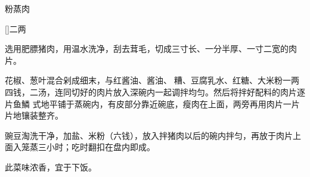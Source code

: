 %
%
%
%
%
%
%
\begin{recipe}{粉蒸肉}

\ingredients

[\footnotemark]{二两}

\preparation

\step 选用肥膘猪肉，用温水洗净，刮去茸毛，切成三寸长、一分半厚、一寸二宽的肉片。

\step 花椒、葱叶混合剁成细末，与红酱油、酱油、𰪿糟、豆腐乳水、红糖、大米粉一两
四钱，二汤，连同切好的肉片放入深碗内一起调拌均匀。然后将拌好配料的肉片逐片鱼鱗
式地平铺于蒸碗内，有皮部分靠近碗底，瘦肉在上面，两旁再用肉片一片片地镶装整齐。

\step 豌豆淘洗干净，加盐、米粉（六钱），放入拌猪肉以后的碗内拌匀，再放于肉片上
面入笼蒸三小时；吃时翻扣在盘内即成。

\features

此菜味浓香，宜于下饭。


\end{recipe}

